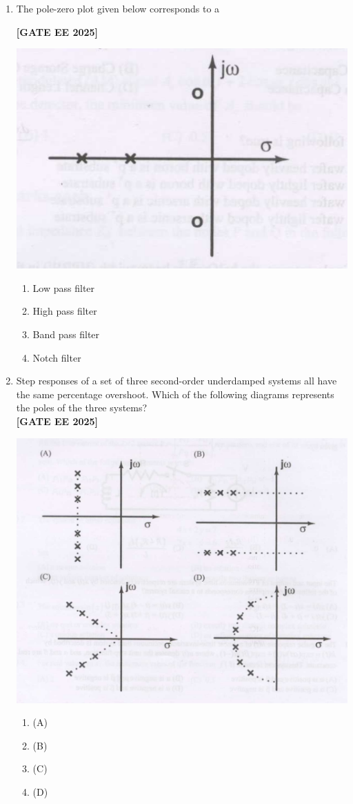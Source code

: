 \documentclass[12pt]{article}
\begin{document}
\begin{enumerate}[leftmargin=2.5em, label=\textbf{Q.\arabic*}., itemsep=2em]
\item The pole-zero plot given below corresponds to a
 
\noindent \textbf{[GATE EE 2025]}
\begin{center}
\includegraphics[width=0.5\columnwidth]{figs/q11.png}
\end{center}
\begin{enumerate}
    \item Low pass filter
    \item High pass filter
    \item Band pass filter
    \item Notch filter
\end{enumerate}

\item Step responses of a set of three second-order underdamped systems all have the same percentage overshoot. Which of the following diagrams represents the poles of the three systems?\\
 
\noindent \textbf{[GATE EE 2025]}
\begin{center}
\includegraphics[width=0.95\columnwidth]{figs/q12.png}
\end{center}
\begin{enumerate}
  \item (A)
  \item (B)
  \item (C)
  \item (D)
\end{enumerate}


\end{enumerate}
\end{document}
